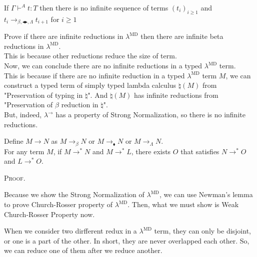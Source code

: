 \documentclass[9pt, a4paper]{extarticle}
\theoremstyle{break}
\newcommand{\G}{\Gamma}
\newcommand{\V}{\vdash}
\newcommand{\TB}{\blacktriangleright}
\newcommand{\TBL}{\blacktriangleleft}
\begin{document}
\begin{thm}
    If $\G\V^A t:T$ then there is no infinite sequence of terms $(t_i)_{i\ge1}$ and $t_i \longrightarrow_{\beta, \TBL \TB,\Lambda} t_{i+1}$ for $i\ge 1$
\end{thm}

Prove if there are infinite reductions in $\lambda^{\text{MD}}$ then there are infinite beta reductions in $\lambda^{\text{MD}}$.\\
This is because other reductions reduce the size of term.\\

Now, we can conclude there are no infinite reductions in a typed $\lambda^{\text{MD}}$ term. \\

This is because if there are no infinite reduction in a typed $\lambda^{\text{MD}}$ term $M$,
we can construct a typed term of simply typed lambda calculus $\natural(M)$ from "Preservation of typing in $\natural$".
And $\natural(M)$ has infinite reductions from "Preservation of $\beta$ reduction in $\natural$".\\

But, indeed, $\lambda^\to$ has a property of Strong Normalization, so there is no infinite reductions.

\begin{thm}
    Define $M \longrightarrow N$ as $M \longrightarrow_{\beta} N$ or $M\longrightarrow_\blacklozenge N$ or  $M \longrightarrow_{\Lambda} N$.\\
    For any term $M$, if $M \longrightarrow^* N$ and $M \longrightarrow^* L$,
    there exists $O$ that satisfies $N \longrightarrow^* O$ and $L \longrightarrow^* O$.
\end{thm}

\textsc{Proof.}

Because we show the Strong Normalization of $\lambda^{\text{MD}}$, we can use Newman's lemma to prove Church-Rosser property of $\lambda^{\text{MD}}$.
Then, what we must show is Weak Church-Rosser Property now.

When we consider two dirfferent redux in a $\lambda^{\text{MD}}$ term, they can only be disjoint, or one is a part of the other.
In short, they are never overlapped each other.
So, we can reduce one of them after we reduce another.\\
\end{document}
